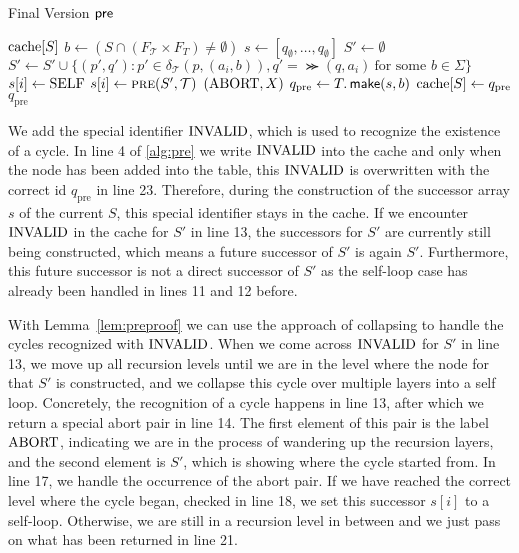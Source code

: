 \begin{algorithm}[ht]
\caption{Final Version $\operatorname{\textsf{pre}}$}\label{alg:pre}
\begin{algorithmic}[1]\smallskip
\If{$\cache[S]$}
\Return $\cache[S]$
\EndIf
\color{blue!75}
\State {$\cache[S] \gets \invalid$} 
\color{black}
\State $b \gets (S \cap (F_{\mathcal{T}} \times F_{T} ) \neq \emptyset)$
\State $s \gets [q_{\emptyset},\dots,q_{\emptyset}]$
\State $S' \gets \emptyset$
\State $S' \gets S' \cup \{ (p',q'): p' \in \delta_{\mathcal{T}}(p,(a_{i},b)), q'=\Succ(q,a_{i}) \ \text{for some $b \in \Sigma$} \}$
\EndFor
{}
\State $s[i] \gets \mathrm{SELF}$
\color{blue!75}
\ElsIf {$\cache[S'] = \invalid$}
\color{black}
\Else
\State $s[i] \gets \Call{pre}{S',\mathcal{T}}$
\color{blue!75}
\Else
\Return $(\mathrm{ABORT}, X)$
\color{black}
\EndIf 
\EndIf
\EndIf
\EndFor
\State $q_{\text{pre}} \gets T.\operatorname{\textsf{make}}(s,b)$
\State $\mathrm{cache}[S] \gets q_{\text{pre}}$
\Return $q_{\text{pre}} $
\EndProcedure
\end{algorithmic}
\end{algorithm}



We add the special identifier $\invalid$, which is used to recognize the existence of a cycle. In line 4 of \autoref{alg:pre} we write $\invalid$ into the cache and only when the node has been added into the table, this $\invalid$ is overwritten with the correct id $q_{\text{pre}}$ in line 23. Therefore, during the construction of the successor array $s$ of the current $S$, this special identifier stays in the cache. If we encounter $\invalid$ in the cache for $S'$ in line 13, the successors for $S'$ are currently still being constructed, which means a future successor of $S'$ is again $S'$. Furthermore, this future successor is not a direct successor of $S'$ as the self-loop case has already been handled in lines 11 and 12 before.

\par

With Lemma~\autoref{lem:preproof} we can use the approach of collapsing to handle the cycles recognized with $\invalid$. When we come across $\invalid$ for $S'$ in line 13, we move up all recursion levels until we are in the level where the node for that $S'$ is constructed, and we collapse this cycle over multiple layers into a self loop. 
Concretely, the recognition of a cycle happens in line 13, after which we return a special abort pair in line 14. 
The first element of this pair is the label $\mathrm{ABORT}$, indicating we are in the process of wandering up the recursion layers, and the second element is $S'$, which is showing where the cycle started from. 
In line 17, we handle the occurrence of the abort pair. If we have reached the correct level where the cycle began, checked in line 18, we set this successor $s[i]$ to a self-loop. Otherwise, we are still in a recursion level in between and we just pass on what has been returned in line 21.


